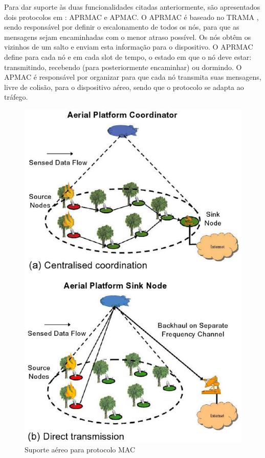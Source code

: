 \documentclass[12pt]{article}
\begin{document}
    Para dar suporte às duas funcionalidades citadas anteriormente, são apresentados dois protocolos em \cite{20100312645920}: APRMAC e APMAC. O APRMAC é baseado no TRAMA \cite{rajendran03}, sendo responsável por definir o escalonamento de todos os nós, para que as mensagens sejam encaminhadas com o menor atraso possível. Os nós obtêm os vizinhos de um salto e enviam esta informação para o dispositivo. O APRMAC define para cada nó e em cada slot de tempo, o estado em que o nó deve estar: transmitindo, recebendo (para posteriormente encaminhar) ou dormindo. O APMAC é responsável por organizar para que cada nó transmita suas mensagens, livre de colisão, para o dispositivo aéreo, sendo que o protocolo se adapta ao tráfego.
    
\begin{figure}
\centering
\includegraphics[scale=0.25]{imagens/aerial}
\caption{Suporte aéreo para protocolo MAC \cite{20100312645920}}
\label{fig:aerial}
\end{figure}
\end{document}

